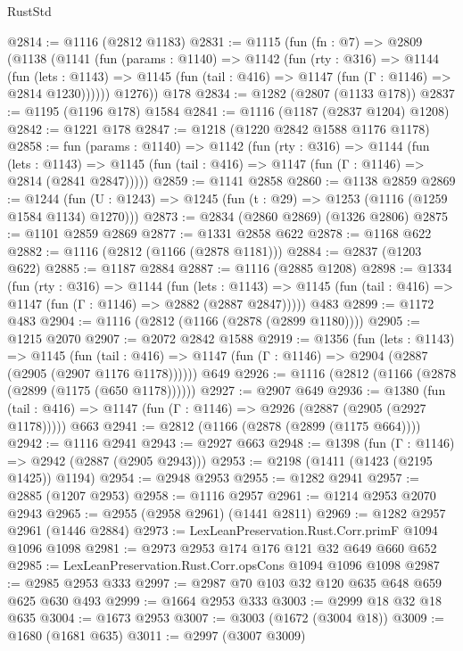 \begin{lexlean}{RustStd}
\begin{coremodule}
@2814 := @1116 (@2812 @1183)
@2831 := @1115
    (fun (fn : @7) =>
    @2809
      (@1138
        (@1141
          (fun (params : @1140) =>
          @1142
            (fun (rty : @316) =>
            @1144
              (fun (lets : @1143) =>
              @1145 (fun (tail : @416) => @1147 (fun (Γ : @1146) => @2814 @1230))))))
        @1276))
    @178
@2834 := @1282 (@2807 (@1133 @178))
@2837 := @1195 (@1196 @178) @1584
@2841 := @1116 (@1187 (@2837 @1204) @1208)
@2842 := @1221 @178
@2847 := @1218 (@1220 @2842 @1588 @1176 @1178)
@2858 := fun (params : @1140) =>
  @1142
    (fun (rty : @316) =>
    @1144
      (fun (lets : @1143) =>
      @1145 (fun (tail : @416) => @1147 (fun (Γ : @1146) => @2814 (@2841 @2847)))))
@2859 := @1141 @2858
@2860 := @1138 @2859
@2869 := @1244 (fun (U : @1243) => @1245 (fun (t : @29) => @1253 (@1116 (@1259 @1584 @1134) @1270)))
@2873 := @2834 (@2860 @2869) (@1326 @2806)
@2875 := @1101 @2859 @2869
@2877 := @1331 @2858 @622
@2878 := @1168 @622
@2882 := @1116 (@2812 (@1166 (@2878 @1181)))
@2884 := @2837 (@1203 @622)
@2885 := @1187 @2884
@2887 := @1116 (@2885 @1208)
@2898 := @1334
    (fun (rty : @316) =>
    @1144
      (fun (lets : @1143) =>
      @1145 (fun (tail : @416) => @1147 (fun (Γ : @1146) => @2882 (@2887 @2847)))))
    @483
@2899 := @1172 @483
@2904 := @1116 (@2812 (@1166 (@2878 (@2899 @1180))))
@2905 := @1215 @2070
@2907 := @2072 @2842 @1588
@2919 := @1356
    (fun (lets : @1143) =>
    @1145
      (fun (tail : @416) => @1147 (fun (Γ : @1146) => @2904 (@2887 (@2905 (@2907 @1176 @1178))))))
    @649
@2926 := @1116 (@2812 (@1166 (@2878 (@2899 (@1175 (@650 @1178))))))
@2927 := @2907 @649
@2936 := @1380
    (fun (tail : @416) => @1147 (fun (Γ : @1146) => @2926 (@2887 (@2905 (@2927 @1178)))))
    @663
@2941 := @2812 (@1166 (@2878 (@2899 (@1175 @664))))
@2942 := @1116 @2941
@2943 := @2927 @663
@2948 := @1398 (fun (Γ : @1146) => @2942 (@2887 (@2905 @2943)))
@2953 := @2198 (@1411 (@1423 (@2195 @1425)) @1194)
@2954 := @2948 @2953
@2955 := @1282 @2941
@2957 := @2885 (@1207 @2953)
@2958 := @1116 @2957
@2961 := @1214 @2953 @2070 @2943
@2965 := @2955 (@2958 @2961) (@1441 @2811)
@2969 := @1282 @2957 @2961 (@1446 @2884)
@2973 := LexLeanPreservation.Rust.Corr.primF @1094 @1096 @1098
@2981 := @2973 @2953 @174 @176 @121 @32 @649 @660 @652
@2985 := LexLeanPreservation.Rust.Corr.opsCons @1094 @1096 @1098
@2987 := @2985 @2953 @333
@2997 := @2987 @70 @103 @32 @120 @635 @648 @659 @625 @630 @493
@2999 := @1664 @2953 @333
@3003 := @2999 @18 @32 @18 @635
@3004 := @1673 @2953
@3007 := @3003 (@1672 (@3004 @18))
@3009 := @1680 (@1681 @635)
@3011 := @2997 (@3007 @3009)

\end{coremodule}
\end{lexlean}
